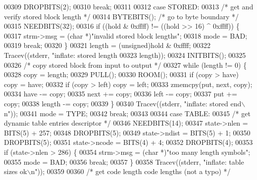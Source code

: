 \begin{DoxyCode}
{{{{{{{00309             DROPBITS(2);
00310             \textcolor{keywordflow}{break};
00311 
00312         \textcolor{keywordflow}{case} STORED:
00313             \textcolor{comment}{/* get and verify stored block length */}
00314             BYTEBITS();                         \textcolor{comment}{/* go to byte boundary */}
00315             NEEDBITS(32);
00316             \textcolor{keywordflow}{if} ((hold & 0xffff) != ((hold >> 16) ^ 0xffff)) \{
00317                 strm->msg = (\textcolor{keywordtype}{char} *)\textcolor{stringliteral}{"invalid stored block lengths"};
00318                 mode = BAD;
00319                 \textcolor{keywordflow}{break};
00320             \}
00321             length = (unsigned)hold & 0xffff;
00322             Tracev((stderr, \textcolor{stringliteral}{"inflate:       stored length %
00323                     length));
00324             INITBITS();
00325 
00326             \textcolor{comment}{/* copy stored block from input to output */}
00327             \textcolor{keywordflow}{while} (length != 0) \{
00328                 copy = length;
00329                 PULL();
00330                 ROOM();
00331                 \textcolor{keywordflow}{if} (copy > have) copy = have;
00332                 \textcolor{keywordflow}{if} (copy > left) copy = left;
00333                 zmemcpy(put, next, copy);
00334                 have -= copy;
00335                 next += copy;
00336                 left -= copy;
00337                 put += copy;
00338                 length -= copy;
00339             \}
00340             Tracev((stderr, \textcolor{stringliteral}{"inflate:       stored end\(\backslash\)n"}));
00341             mode = TYPE;
00342             \textcolor{keywordflow}{break};
00343 
00344         \textcolor{keywordflow}{case} TABLE:
00345             \textcolor{comment}{/* get dynamic table entries descriptor */}
00346             NEEDBITS(14);
00347             state->nlen = BITS(5) + 257;
00348             DROPBITS(5);
00349             state->ndist = BITS(5) + 1;
00350             DROPBITS(5);
00351             state->ncode = BITS(4) + 4;
00352             DROPBITS(4);
00353             \textcolor{keywordflow}{if} (state->nlen > 286) \{
00354                 strm->msg = (\textcolor{keywordtype}{char} *)\textcolor{stringliteral}{"too many length symbols"};
00355                 mode = BAD;
00356                 \textcolor{keywordflow}{break};
00357             \}
00358             Tracev((stderr, \textcolor{stringliteral}{"inflate:       table sizes ok\(\backslash\)n"}));
00359 
00360             \textcolor{comment}{/* get code length code lengths (not a typo) */}
}}}}}}}}
\end{DoxyCode}
